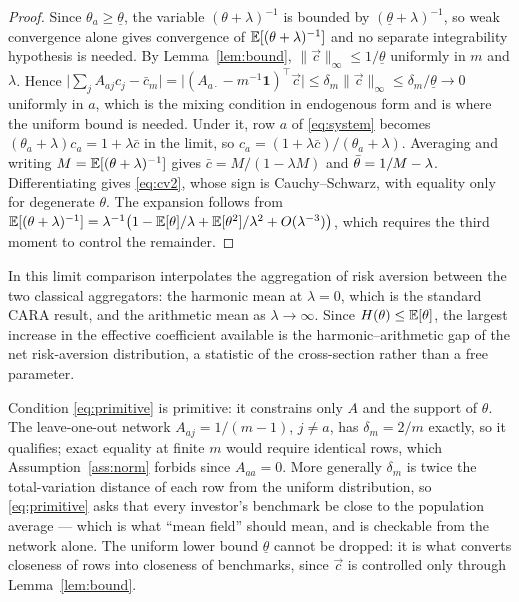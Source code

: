 \begin{proof}
Since $\theta_a\geq\underline\theta$, the variable $(\theta+\lambda)^{-1}$ is
bounded by $(\underline\theta+\lambda)^{-1}$, so weak convergence alone gives
convergence of $\mathbb{E}[(\theta+\lambda)^{-1}]$ and no separate integrability
hypothesis is needed. By Lemma~\ref{lem:bound},
$\|\vec c\|_\infty\leq1/\underline\theta$ uniformly in $m$ and $\lambda$. Hence
$\big|\sum_jA_{aj}c_j-\bar c_m\big|
=\big|(A_{a\cdot}-m^{-1}\mathbf 1)^{\top}\vec c\big|
\leq\delta_m\|\vec c\|_\infty\leq\delta_m/\underline\theta\to0$
uniformly in $a$, which is the mixing condition in endogenous form and is where
the uniform bound is needed. Under it, row $a$ of \eqref{eq:system} becomes
$(\theta_a+\lambda)c_a=1+\lambda\bar c$ in the limit, so
$c_a=(1+\lambda\bar c)/(\theta_a+\lambda)$. Averaging and writing
$M=\mathbb{E}[(\theta+\lambda)^{-1}]$ gives $\bar c=M/(1-\lambda M)$ and
$\bar\theta=1/M-\lambda$. Differentiating gives \eqref{eq:cv2}, whose sign is
Cauchy--Schwarz, with equality only for degenerate $\theta$. The expansion
follows from
$\mathbb{E}[(\theta+\lambda)^{-1}]
=\lambda^{-1}\big(1-\mathbb{E}[\theta]/\lambda+\mathbb{E}[\theta^{2}]/\lambda^{2}
+O(\lambda^{-3})\big)$, which requires the third moment to control the
remainder.
\end{proof}

In this limit comparison interpolates the aggregation of risk aversion between
the two classical aggregators: the harmonic mean at $\lambda=0$, which is the
standard CARA result, and the arithmetic mean as $\lambda\to\infty$. Since
$H(\theta)\leq\mathbb{E}[\theta]$, the largest increase in the effective coefficient
available is the harmonic--arithmetic gap of the net risk-aversion
distribution, a
statistic of the cross-section rather than a free parameter.

Condition \eqref{eq:primitive} is primitive: it constrains only $A$ and the
support of $\theta$. The leave-one-out network $A_{aj}=1/(m-1)$, $j\neq a$, has
$\delta_m=2/m$ exactly, so it qualifies; exact equality at finite $m$ would
require identical rows, which Assumption~\ref{ass:norm} forbids since
$A_{aa}=0$. More generally $\delta_m$ is twice the total-variation distance of
each row from the uniform distribution, so \eqref{eq:primitive} asks that every
investor's benchmark be close to the population average --- which is what
``mean field'' should mean, and is checkable from the network alone. The uniform
lower bound $\underline\theta$ cannot be dropped: it is what converts closeness
of rows into closeness of benchmarks, since $\vec c$ is controlled only through
Lemma~\ref{lem:bound}.

